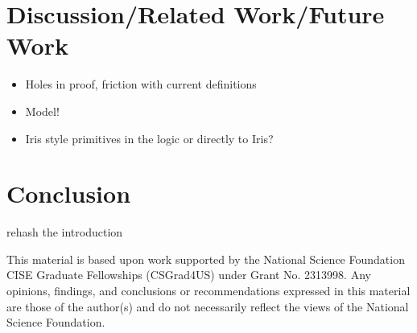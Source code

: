 \documentclass[acmsmall]{acmart}
\begin{document}
\section{Discussion/Related Work/Future Work}
\begin{itemize}
  \item Holes in proof, friction with current definitions
  \item Model!
  \item Iris style primitives in the logic or directly to Iris?
\end{itemize}

\section{Conclusion}
rehash the introduction

\begin{acks}
This material is based upon work supported by the National Science Foundation CISE Graduate Fellowships (CSGrad4US) under Grant No. 2313998. Any opinions, findings, and conclusions or recommendations expressed in this material are those of the author(s) and do not necessarily reflect the views of the National Science Foundation.
\end{acks}





\end{document}
